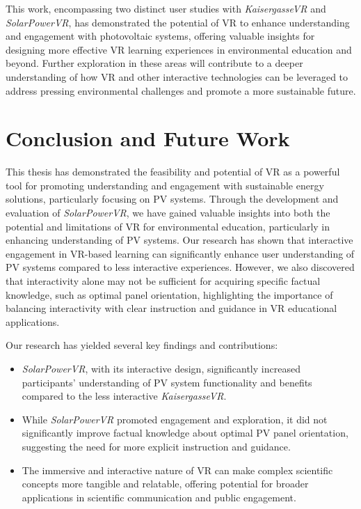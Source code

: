 \documentclass[draft, final]{vutinfth} %
\begin{document}
This work, encompassing two distinct user studies with \textit{KaisergasseVR} and \textit{SolarPowerVR}, has demonstrated the potential of VR to enhance understanding and engagement with photovoltaic systems, offering valuable insights for designing more effective VR learning experiences in environmental education and beyond. Further exploration in these areas will contribute to a deeper understanding of how VR and other interactive technologies can be leveraged to address pressing environmental challenges and promote a more sustainable future.


\chapter{Conclusion and Future Work}

This thesis has demonstrated the feasibility and potential of VR as a powerful tool for promoting understanding and engagement with sustainable energy solutions, particularly focusing on PV systems. Through the development and evaluation of \textit{SolarPowerVR}, we have gained valuable insights into both the potential and limitations of VR for environmental education, particularly in enhancing understanding of PV systems. Our research has shown that interactive engagement in VR-based learning can significantly enhance user understanding of PV systems compared to less interactive experiences. However, we also discovered that interactivity alone may not be sufficient for acquiring specific factual knowledge, such as optimal panel orientation, highlighting the importance of balancing interactivity with clear instruction and guidance in VR educational applications. 

Our research has yielded several key findings and contributions:

\begin{itemize}
    \item \textit{SolarPowerVR}, with its interactive design, significantly increased participants' understanding of PV system functionality and benefits compared to the less interactive \textit{KaisergasseVR}.
    \item While \textit{SolarPowerVR} promoted engagement and exploration, it did not significantly improve factual knowledge about optimal PV panel orientation, suggesting the need for more explicit instruction and guidance.
    \item The immersive and interactive nature of VR can make complex scientific concepts more tangible and relatable, offering potential for broader applications in scientific communication and public engagement.
\end{itemize}
\end{document}
